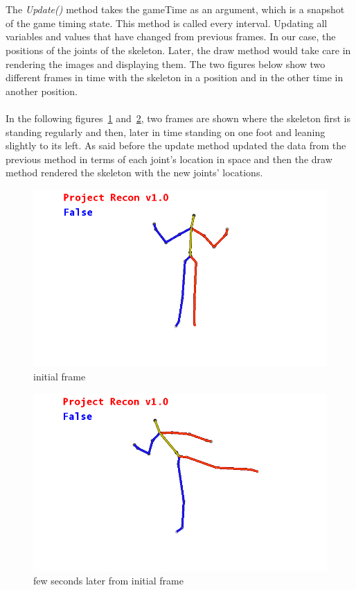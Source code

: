 \\
\\
The \emph{Update()} method takes the gameTime as an argument, which is a snapshot of the game timing state. This method is called every interval. Updating all variables and values that have changed from previous frames. In our case, the positions of the joints of the skeleton. Later, the draw method would take care in rendering the images and displaying them. The two figures below show two different frames in time with the skeleton in a position and in the other time in another position.
\\
\\
In the following figures~\ref{skeletonframe1} and~\ref{skeletonframe2}, two frames are shown where the skeleton first is standing regularly and then, later in time standing on one foot and leaning slightly to its left. As said before the update method updated the data from the previous method in terms of each joint's location in space and then the draw method rendered the skeleton with the new joints' locations.

\begin{figure}[!htbp]
\centering
\includegraphics[width=1\textwidth]{images/skeleton_frame1.png}
\caption{initial frame}
\label{skeletonframe1}
\end{figure}

\begin{figure}[!htbp]
\centering
\includegraphics[width=1\textwidth]{images/skeleton_frame2.png}
\caption{few seconds later from initial frame}
\label{skeletonframe2}
\end{figure}

